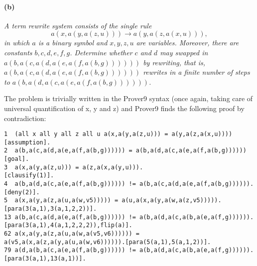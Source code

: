 \documentclass[12pt]{article}
\begin{document}
\paragraph{(b)} 
\textit{A term rewrite system consists of the single rule
$$a(x,a(y,a(z,u)))\rightarrow a(y,a(z,a(x,u))),$$
in which $a$ is a binary symbol and $x,y,z,u$ are variables.
Moreover, there are constants $b,c,d,e,f,g$. Determine whether
$c$ and $d$ may swapped in $a(b,a(c,a(d,a(e,a(f,a(b,g))))))$ by
rewriting, that is, $a(b,a(c,a(d,a(e,a(f,a(b,g))))))$ rewrites
in a finite number of steps to
$a(b,a(d,a(c,a(e,a(f,a(b,g))))))$.}

\vspace{3mm}

The problem is trivially written in the Prover9 syntax (once again, taking care
of universal quantification of x, y and z) and Prover9 finds the following 
proof by contradiction:

\begin{lstlisting}
1  (all x all y all z all u a(x,a(y,a(z,u))) = a(y,a(z,a(x,u))))        [assumption].
2  a(b,a(c,a(d,a(e,a(f,a(b,g)))))) = a(b,a(d,a(c,a(e,a(f,a(b,g))))))    [goal].
3  a(x,a(y,a(z,u))) = a(z,a(x,a(y,u))).                                 [clausify(1)].
4  a(b,a(d,a(c,a(e,a(f,a(b,g)))))) != a(b,a(c,a(d,a(e,a(f,a(b,g)))))).  [deny(2)].
5  a(x,a(y,a(z,a(u,a(w,v5))))) = a(u,a(x,a(y,a(w,a(z,v5))))).           [para(3(a,1),3(a,1,2,2))].
13 a(b,a(c,a(d,a(e,a(f,a(b,g)))))) != a(b,a(d,a(c,a(b,a(e,a(f,g)))))).[para(3(a,1),4(a,1,2,2,2)),flip(a)].
62 a(x,a(y,a(z,a(u,a(w,a(v5,v6)))))) = a(v5,a(x,a(z,a(y,a(u,a(w,v6)))))).[para(5(a,1),5(a,1,2))].
79 a(d,a(b,a(c,a(e,a(f,a(b,g)))))) != a(b,a(d,a(c,a(b,a(e,a(f,g)))))).  [para(3(a,1),13(a,1))].
\end{lstlisting}
\end{document}
